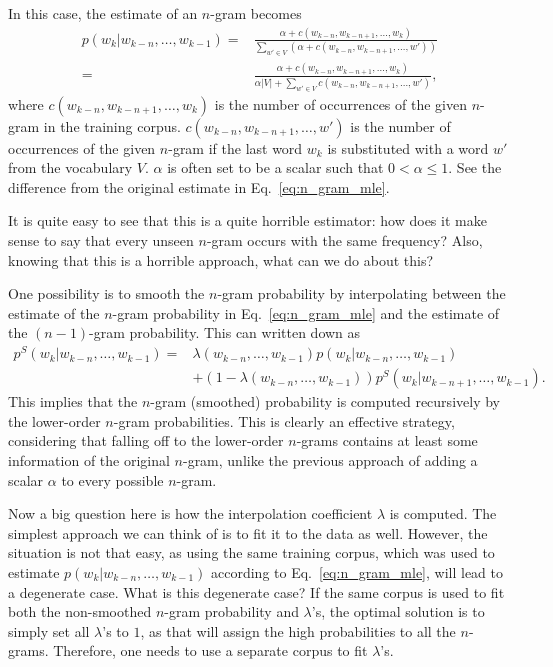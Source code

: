 \documentclass{report}
\begin{document}
In this case, the estimate of an $n$-gram becomes
\begin{align*}
    p(w_k | w_{k-n}, \ldots, w_{k-1}) =&
    \frac{\alpha + c(w_{k-n}, w_{k-n+1}, \ldots, w_k)}{\sum_{w' \in V} (\alpha
    + c(w_{k-n}, w_{k-n+1}, \ldots, w'))} 
    \\
    =&
    \frac{\alpha + c(w_{k-n}, w_{k-n+1}, \ldots, w_k)}{\alpha |V| + \sum_{w' \in V}
    c(w_{k-n}, w_{k-n+1}, \ldots, w')},
\end{align*}
where $c(w_{k-n}, w_{k-n+1}, \ldots, w_k)$ is the number of occurrences of the
given $n$-gram in the training corpus. $c(w_{k-n}, w_{k-n+1}, \ldots, w')$ is
the number of occurrences of the given $n$-gram if the last word $w_k$ is
substituted with a word $w'$ from the vocabulary $V$. $\alpha$ is often set to
be a scalar such that $0 < \alpha \leq 1$. See the difference from the original
estimate in Eq.~\eqref{eq:n_gram_mle}.

It is quite easy to see that this is a quite horrible estimator: how does it
make sense to say that every unseen $n$-gram occurs with the same frequency?
Also, knowing that this is a horrible approach, what can we do about this?

One possibility is to smooth the $n$-gram probability by interpolating between
the estimate of the $n$-gram probability in Eq.~\eqref{eq:n_gram_mle} and the
estimate of the $(n-1)$-gram probability. This can written down as
\begin{align}
    p^S(w_k | w_{k-n}, \ldots, w_{k-1}) = &
    \lambda(w_{k-n}, \ldots, w_{k-1}) p(w_k | w_{k-n}, \ldots, w_{k-1}) 
    \nonumber \\
    \label{eq:n_gram_smooth}
    & + (1 - \lambda(w_{k-n}, \ldots, w_{k-1})) p^S(w_k | w_{k-n+1}, \ldots,
    w_{k-1}).
\end{align}
This implies that the $n$-gram (smoothed) probability is computed recursively by
the lower-order $n$-gram probabilities. This is clearly an effective strategy,
considering that falling off to the lower-order $n$-grams contains at least some
information of the original $n$-gram, unlike the previous approach of adding a
scalar $\alpha$ to every possible $n$-gram.

Now a big question here is how the interpolation coefficient $\lambda$ is
computed. The simplest approach we can think of is to fit it to the data as
well. However, the situation is not that easy, as using the same training
corpus, which was used to estimate $p(w_k | w_{k-n}, \ldots, w_{k-1})$ according
to Eq.~\eqref{eq:n_gram_mle}, will lead to a degenerate case. What is this
degenerate case? If the same corpus is used to fit both the non-smoothed
$n$-gram probability and $\lambda$'s, the optimal solution is to simply set all
$\lambda$'s to $1$, as that will assign the high probabilities to all the
$n$-grams. Therefore, one needs to use a separate corpus to fit $\lambda$'s.
\end{document}
